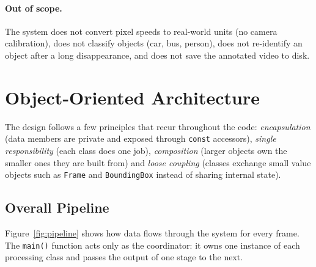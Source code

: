\documentclass[12pt,a4paper,oneside]{book}
\begin{document}
\paragraph{Out of scope.} The system does not convert pixel speeds to real-world units (no camera calibration), does not classify objects (car, bus, person), does not re-identify an object after a long disappearance, and does not save the annotated video to disk.

\section{Object-Oriented Architecture}
The design follows a few principles that recur throughout the code: \emph{encapsulation} (data members are private and exposed through \texttt{const} accessors), \emph{single responsibility} (each class does one job), \emph{composition} (larger objects own the smaller ones they are built from) and \emph{loose coupling} (classes exchange small value objects such as \texttt{Frame} and \texttt{BoundingBox} instead of sharing internal state).

\subsection{Overall Pipeline}
Figure~\ref{fig:pipeline} shows how data flows through the system for every frame. The \texttt{main()} function acts only as the coordinator: it owns one instance of each processing class and passes the output of one stage to the next.
\end{document}
